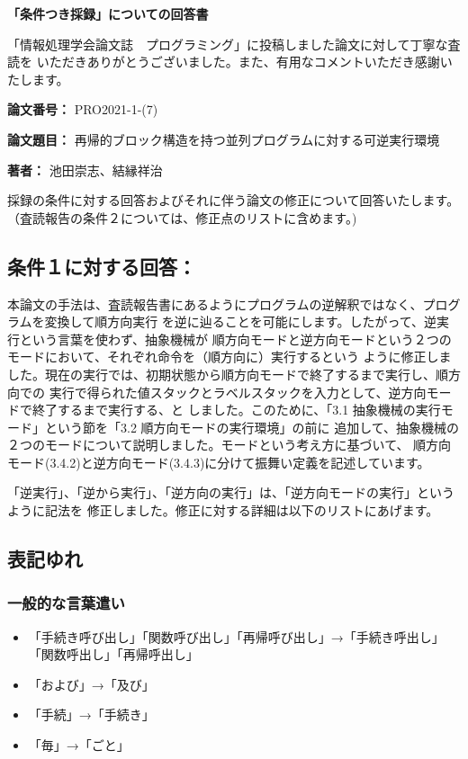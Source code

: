 \documentclass[a4j]{jarticle}
\begin{document}
\begin{center}
{\bf\Large
「条件つき採録」についての回答書
}
\end{center}

「情報処理学会論文誌　プログラミング」に投稿しました論文に対して丁寧な査読を
いただきありがとうございました。また、有用なコメントいただき感謝いたします。

\begin{list}{}{}
\item [{\bf 論文番号：}] PRO2021-1-(7)
\item [{\bf 論文題目：}] 再帰的ブロック構造を持つ並列プログラムに対する可逆実行環境
\item [{\bf 著者：}] 池田崇志、結縁祥治
\end{list}

採録の条件に対する回答およびそれに伴う論文の修正について回答いたします。
（査読報告の条件２については、修正点のリストに含めます。)

\subsection*{条件１に対する回答：}
本論文の手法は、査読報告書にあるようにプログラムの逆解釈ではなく、プログラムを変換して順方向実行
を逆に辿ることを可能にします。したがって、逆実行という言葉を使わず、抽象機械が
順方向モードと逆方向モードという２つのモードにおいて、それぞれ命令を（順方向に）実行するという
ように修正しました。現在の実行では、初期状態から順方向モードで終了するまで実行し、順方向での
実行で得られた値スタックとラベルスタックを入力として、逆方向モードで終了するまで実行する、と
しました。このために、「3.1 抽象機械の実行モード」という節を「3.2 順方向モードの実行環境」の前に
追加して、抽象機械の２つのモードについて説明しました。モードという考え方に基づいて、
順方向モード(3.4.2)と逆方向モード(3.4.3)に分けて振舞い定義を記述しています。

「逆実行」、「逆から実行」、「逆方向の実行」は、「逆方向モードの実行」というように記法を
修正しました。修正に対する詳細は以下のリストにあげます。

\subsection*{表記ゆれ}

\subsubsection*{一般的な言葉遣い}
\begin{itemize}
\item 「手続き呼び出し」「関数呼び出し」「再帰呼び出し」→「手続き呼出し」「関数呼出し」「再帰呼出し」
\item 「および」→「及び」
\item 「手続」→「手続き」
\item 「毎」→「ごと」
\end{itemize}
\end{document}
